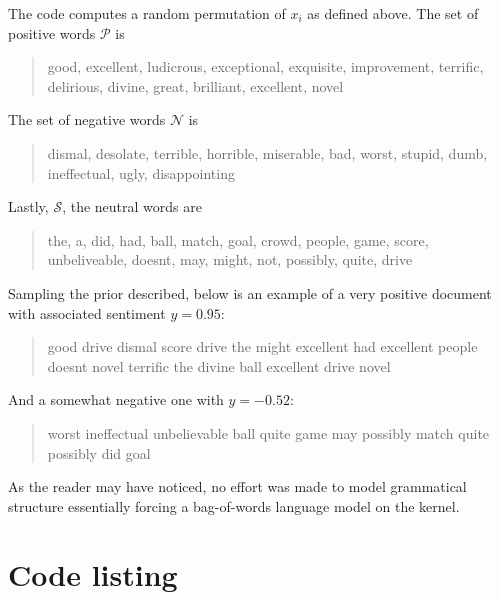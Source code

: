 \documentclass[a4paper, twoside, 12pt, fleqn]{article}
\begin{document}
\newline
The code computes a random permutation of $x_i$ as defined above. The
set of positive words $\mathcal{P}$ is
\begin{quote}
good, excellent, ludicrous, exceptional, exquisite,
improvement, terrific, delirious, divine, great,
brilliant, excellent, novel
\end{quote}
The set of negative words $\mathcal{N}$ is
\begin{quote}
dismal, desolate, terrible, horrible, miserable,
bad, worst, stupid, dumb, ineffectual, ugly,
disappointing
\end{quote}
Lastly, $\mathcal{S}$, the neutral words are
\begin{quote}
the, a, did, had, ball, match, goal, crowd,
people, game, score, unbeliveable, doesnt, may,
might, not, possibly, quite, drive
\end{quote}
Sampling the prior described, below is an example of a very positive
document with associated sentiment $y=0.95$:
\begin{quote}
good drive dismal score drive the might excellent had excellent people
doesnt novel terrific the divine ball excellent drive novel
\end{quote}
And a somewhat negative one with $y=-0.52$:
\begin{quote}
worst ineffectual unbelievable ball quite game may possibly match
quite possibly did goal
\end{quote}
As the reader may have noticed, no effort was made to model
grammatical structure essentially forcing a bag-of-words language
model on the kernel.


\newpage
\section*{Code listing}




\end{document}
